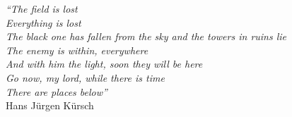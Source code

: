 \cleardoublepage
\thispagestyle{plain}

\vspace*{8cm}

\begin{flushright}
   \textsl{``The field is lost\\
Everything is lost\\
The black one has fallen from the sky and the towers in ruins lie\\
The enemy is within, everywhere\\
And with him the light, soon they will be here\\
Go now, my lord, while there is time\\
There are places below''} \\
\vspace*{1.5cm}
           Hans Jürgen Kürsch
\end{flushright}
